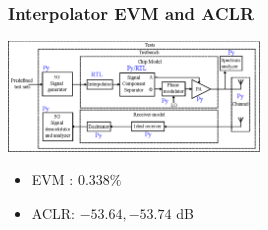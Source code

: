 \documentclass{sdkslides}
\begin{document}
\begin{frame}[t]
    \frametitle{Interpolator EVM and ACLR}
    \begin{center}
        \includegraphics[width=0.5\textwidth]{Pics/outphasing_model_interp.eps}
    \end{center}
    \begin{figure}
        \qquad
    \end{figure}
    \begin{itemize}
        \item EVM : $0.338\%$
        \item ACLR: $-53.64, -53.74$ dB
    \end{itemize}

\end{frame}
\end{document}
